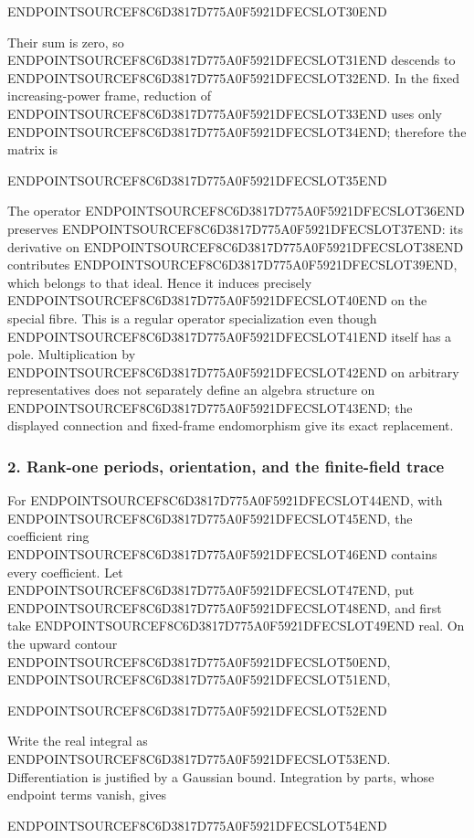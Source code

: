 ENDPOINTSOURCEF8C6D3817D775A0F5921DFECSLOT30END

Their sum is zero, so ENDPOINTSOURCEF8C6D3817D775A0F5921DFECSLOT31END descends to ENDPOINTSOURCEF8C6D3817D775A0F5921DFECSLOT32END. In the fixed increasing-power frame, reduction of ENDPOINTSOURCEF8C6D3817D775A0F5921DFECSLOT33END uses only ENDPOINTSOURCEF8C6D3817D775A0F5921DFECSLOT34END; therefore the matrix is

ENDPOINTSOURCEF8C6D3817D775A0F5921DFECSLOT35END

The operator ENDPOINTSOURCEF8C6D3817D775A0F5921DFECSLOT36END preserves ENDPOINTSOURCEF8C6D3817D775A0F5921DFECSLOT37END: its derivative on ENDPOINTSOURCEF8C6D3817D775A0F5921DFECSLOT38END contributes ENDPOINTSOURCEF8C6D3817D775A0F5921DFECSLOT39END, which belongs to that ideal. Hence it induces precisely ENDPOINTSOURCEF8C6D3817D775A0F5921DFECSLOT40END on the special fibre. This is a regular operator specialization even though ENDPOINTSOURCEF8C6D3817D775A0F5921DFECSLOT41END itself has a pole. Multiplication by ENDPOINTSOURCEF8C6D3817D775A0F5921DFECSLOT42END on arbitrary representatives does not separately define an algebra structure on ENDPOINTSOURCEF8C6D3817D775A0F5921DFECSLOT43END; the displayed connection and fixed-frame endomorphism give its exact replacement.

\subsubsection{2. Rank-one periods, orientation, and the finite-field trace}\label{endpoint-purity_review--rank-one-periods-orientation-and-the-finite-field-trace}

For ENDPOINTSOURCEF8C6D3817D775A0F5921DFECSLOT44END, with ENDPOINTSOURCEF8C6D3817D775A0F5921DFECSLOT45END, the coefficient ring ENDPOINTSOURCEF8C6D3817D775A0F5921DFECSLOT46END contains every coefficient. Let ENDPOINTSOURCEF8C6D3817D775A0F5921DFECSLOT47END, put ENDPOINTSOURCEF8C6D3817D775A0F5921DFECSLOT48END, and first take ENDPOINTSOURCEF8C6D3817D775A0F5921DFECSLOT49END real. On the upward contour ENDPOINTSOURCEF8C6D3817D775A0F5921DFECSLOT50END, ENDPOINTSOURCEF8C6D3817D775A0F5921DFECSLOT51END,

ENDPOINTSOURCEF8C6D3817D775A0F5921DFECSLOT52END

Write the real integral as ENDPOINTSOURCEF8C6D3817D775A0F5921DFECSLOT53END. Differentiation is justified by a Gaussian bound. Integration by parts, whose endpoint terms vanish, gives

ENDPOINTSOURCEF8C6D3817D775A0F5921DFECSLOT54END


